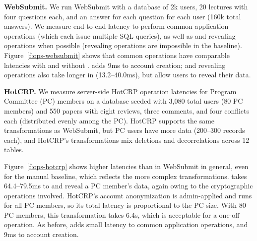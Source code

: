 \textbf{WebSubmit.}
%
We run WebSubmit with a database of 2k users, 20 lectures with four questions
each, and an answer for each question for each user (160k total answers).
%
We measure end-to-end latency to perform common application operations (which
each issue multiple SQL queries), as well as \xxing and revealing operations
when possible (revealing operations are impossible in the baseline).
%
%
%
Figure~\ref{f:ops-websubmit} shows that common operations have comparable
latencies with and without \sys.
%
\sys adds 9ms to account creation; \xxing and revealing operations also take
longer in \sys (13.2--40.0ms), but allow users to reveal their data.
%

\textbf{HotCRP.}
%
We measure server-side HotCRP operation latencies for Program Committee (PC) members on a database seeded with 3,080
total users (80 PC members)
and 550 papers with eight reviews, three comments, and four conflicts each
(distributed evenly among the PC).
%
HotCRP supports the same \xxing transformations as WebSubmit, but PC users have more
data (200--300 records each), and HotCRP's \xxing transformations mix deletions and
decorrelations across 12 tables. %
%

%
Figure~\ref{f:ops-hotcrp} shows higher latencies than in WebSubmit in general, even for the manual
baseline, which reflects the more complex \xxing transformations.
%
\sys takes 64.4--79.5ms to \xx and reveal a PC member's data, again owing to the
cryptographic operations involved.
%
HotCRP's account anonymization is admin-applied and runs for all PC members, so
its total latency is proportional to the PC size.
%
With 80 PC members, this transformation takes 6.4s, which is acceptable for a
one-off operation.
%
As before, \sys adds small latency to common application operations, and 9ms to
account creation.
%

